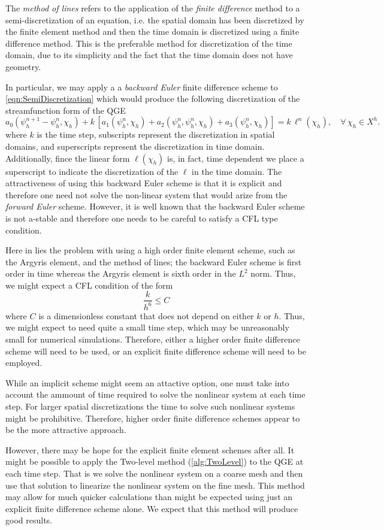 The \emph{method of lines} refers to the application of the \emph{finite
difference} method to a semi-discretization of an equation, i.e. the spatial
domain has been discretized by the finite element method and then the time
domain is discretized using a finite difference method. This is the preferable
method for discretization of the time domain, due to its simplicity and the fact
that the time domain does not have geometry.

In particular, we may apply a a \emph{backward Euler} finite difference scheme
to \eqref{eqn:SemiDiscretization} which would produce the following
discretization of the streamfunction form of the QGE
\begin{equation}
  a_0(\psi_h^{n+1} - \psi_h^n, \chi_h) + k\, \left[a_1(\psi_h^n,\chi_h) + a_2(\psi_h^n,\psi_h^n,\chi_h)
      + a_3(\psi_h^n,\chi_h)\right] = k\, \ell^n(\chi_h),\quad \forall \, \chi_h \in X^h.
  \label{eqn:BEQGE}
\end{equation}
where $k$ is the time step, subscripts represent the discretization in spatial
domains, and superscripts represent the discretization in time domain.
Additionally, fince the linear form $\ell(\chi_h)$ is, in fact, time dependent
we place a superscript to indicate the discretization of the $\ell$ in the time
domain.  The attractiveness of using this backward Euler scheme is that it is
explicit and therefore one need not solve the non-linear system that would arize
from the \emph{forward Euler} scheme. However, it is well known that the
backward Euler scheme is not a-stable and therefore one needs to be careful to
satisfy a CFL type condition.

Here in lies the problem with using a high order finite element scheme, such as
the Argyris element, and the method of lines; the backward Euler scheme is first
order in time whereas the Argyris element is sixth order in the $L^2$ norm.
Thus, we might expect a CFL condition of the form
\begin{equation*}
  \frac{k}{h^6} \le C
\end{equation*}
where $C$ is a dimensionless constant that does not depend on either $k$ or $h$.
Thus, we might expect to need quite a small time step, which may be unreasonably
small for numerical simulations.  Therefore, either a higher order finite
difference scheme will need to be used, or an explicit finite difference scheme
will need to be employed.

While an implicit scheme might seem an attactive option, one must take into
account the ammount of time required to solve the nonlinear system at each time
step. For larger spatial discretizations the time to solve such nonlinear
systems might be prohibitive. Therefore, higher order finite difference schemes
appear to be the more attractive approach.

However, there may be hope for the explicit finite element schemes after all. It
might be possible to apply the Two-level method (\autoref{alg:TwoLevel}) to the
QGE at each time step. That is we solve the nonlinear system on a coarse mesh
and then use that solution to linearize the nonlinear system on the fine mesh.
This method may allow for much quicker calculations than might be expected using
just an explicit finite difference scheme alone. We expect that this method will
produce good results.

